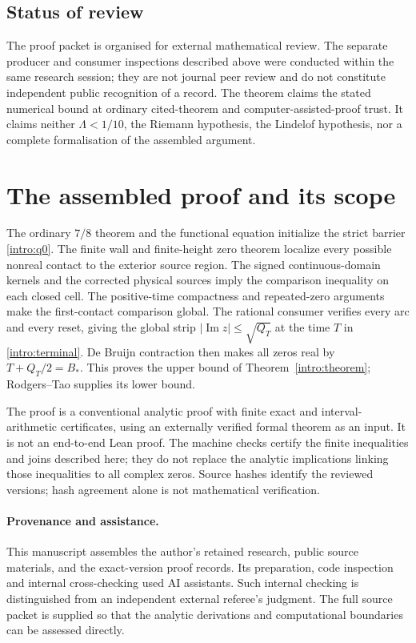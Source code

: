 \documentclass[11pt,a4paper]{article}
\theoremstyle{definition}
\theoremstyle{remark}
\newcommand{\Lam}{\Lambda}
\newcommand{\Imm}{\operatorname{Im}}
\begin{document}
\subsection{Status of review}\label{ver:status}

The proof packet is organised for external mathematical review.  The
separate producer and consumer inspections described above were conducted
within the same research session; they are not journal peer review and do
not constitute independent public recognition of a record.  The theorem
claims the stated numerical bound at ordinary cited-theorem and
computer-assisted-proof trust.  It claims neither $\Lam<1/10$, the Riemann
hypothesis, the Lindelof hypothesis, nor a complete formalisation of the
assembled argument.



\section{The assembled proof and its scope}\label{end:assembly}
The ordinary $7/8$ theorem and the functional equation initialize the
strict barrier \eqref{intro:q0}. The finite wall and finite-height zero
theorem localize every possible nonreal contact to the exterior source
region. The signed continuous-domain kernels and the corrected physical
sources imply the comparison inequality on each closed cell. The
positive-time compactness and repeated-zero arguments make the
first-contact comparison global. The rational consumer verifies every
arc and every reset, giving the global strip
$|\Imm z|\le\sqrt{Q_T}$ at the time $T$ in
\eqref{intro:terminal}. De Bruijn contraction then makes all zeros real
by $T+Q_T/2=B_*$. This proves the upper bound of
Theorem~\ref{intro:theorem}; Rodgers--Tao supplies its lower bound.

The proof is a conventional analytic proof with finite exact and
interval-arithmetic certificates, using an externally verified formal
theorem as an input. It is not an end-to-end Lean proof. The machine
checks certify the finite inequalities and joins described here; they
do not replace the analytic implications linking those inequalities
to all complex zeros. Source hashes identify the reviewed versions;
hash agreement alone is not mathematical verification.

\paragraph{Provenance and assistance.}
This manuscript assembles the author's retained research, public source
materials, and the exact-version proof records. Its preparation,
code inspection and internal cross-checking used AI assistants. Such
internal checking is distinguished from an independent external
referee's judgment. The full source packet is supplied so that the
analytic derivations and computational boundaries can be assessed
directly.
\end{document}
